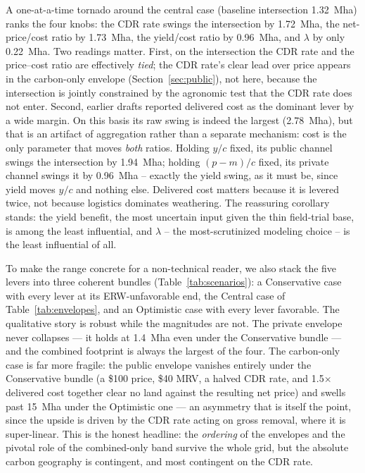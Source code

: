 \documentclass[12pt]{article}
\begin{document}
A one-at-a-time tornado around the central case (baseline intersection 1.32~Mha)
ranks the four knobs: the CDR rate swings the intersection by 1.72~Mha, the
net-price/cost ratio by 1.73~Mha, the yield/cost ratio by 0.96~Mha, and $\lambda$
by only 0.22~Mha. Two readings matter. First, on the intersection the CDR rate and
the price--cost ratio are effectively \emph{tied}; the CDR rate's clear lead over
price appears in the carbon-only envelope (Section~\ref{sec:public}), not here,
because the intersection is jointly constrained by the agronomic test that the CDR
rate does not enter. Second, earlier drafts reported delivered cost as the dominant
lever by a wide margin. On this basis its raw swing is indeed the largest
(2.78~Mha), but that is an artifact of aggregation rather than a separate
mechanism: cost is the only parameter that moves \emph{both} ratios. Holding $y/c$
fixed, its public channel swings the intersection by 1.94~Mha; holding $(p-m)/c$
fixed, its private channel swings it by 0.96~Mha -- exactly the yield swing, as it
must be, since yield moves $y/c$ and nothing else. Delivered cost matters because
it is levered twice, not because logistics dominates weathering. The reassuring
corollary stands: the yield benefit, the most uncertain input given the thin
field-trial base, is among the least influential, and $\lambda$ -- the
most-scrutinized modeling choice -- is the least influential of all.

To make the range concrete for a non-technical reader, we also stack the five
levers into three coherent bundles (Table~\ref{tab:scenarios}): a Conservative case
with every lever at its ERW-unfavorable end, the Central case of
Table~\ref{tab:envelopes}, and an Optimistic case with every lever favorable. The
qualitative story is robust while the magnitudes are not. The private envelope never
collapses --- it holds at 1.4~Mha even under the Conservative bundle --- and the
combined footprint is always the largest of the four. The carbon-only case is far
more fragile: the public envelope vanishes entirely under the Conservative bundle (a
\$100 price, \$40 MRV, a halved CDR rate, and 1.5$\times$ delivered cost together
clear no land against the resulting net price) and swells past 15~Mha under the
Optimistic one --- an asymmetry that is itself the point, since the upside is driven
by the CDR rate acting on gross removal, where it is super-linear. This is the honest
headline: the \emph{ordering} of the envelopes and the pivotal role of the
combined-only band survive the whole grid, but the absolute carbon geography is
contingent, and most contingent on the CDR rate.
\end{document}
